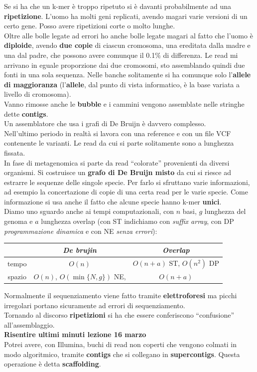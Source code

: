 \documentclass[a4paper,12pt, oneside]{book}
\begin{document}
Se si ha che un k-mer è troppo ripetuto si è davanti probabilmente ad una
\textbf{ripetizione}. L'uomo ha molti geni replicati, avendo magari varie
versioni di un certo gene. Posso avere ripetizioni corte o molto lunghe.\\
Oltre alle bolle legate ad errori ho anche bolle legate magari al fatto che
l'uomo è \textbf{diploide}, avendo \textbf{due copie} di ciascun cromosoma, una
ereditata dalla madre e una dal padre, che possono avere comunque il 0.1\% di
differenza. Le read mi arrivano in eguale proporzione dai due cromosomi, sto
assemblando quindi due fonti in una sola sequenza. Nelle banche solitamente si
ha comunque solo l'\textbf{allele di maggioranza} (l'\textbf{allele}, dal punto
di vista informatico, è la base variata a livello di cromosoma). \\
Vanno rimosse anche le \textbf{bubble} e i cammini vengono assemblate nelle
stringhe dette \textbf{contigs}.\\
Un assemblatore che usa i grafi di De Bruijn è davvero complesso.\\
Nell'ultimo periodo in realtà si lavora con una reference e con un file VCF
contenente le varianti. Le read da cui si parte solitamente sono a lunghezza
fissata. \\
In fase di metagenomica si parte da read ``colorate'' provenienti da diversi
organismi. Si costruisce un \textbf{grafo di De Bruijn misto} da cui si riesce
ad estrarre le sequenze delle singole specie. Per farlo si sfruttano varie
informazioni, ad esempio la concertazione di copie di una certa read per le
varie specie. Come informazione si usa anche il fatto che alcune specie hanno
k-mer \textbf{unici}. \\
Diamo uno sguardo anche ai tempi computazionali, con $n$ basi, $g$ lunghezza del
genoma e $a$ lunghezza overlap (con ST indichiamo con \textit{suffix array}, con
DP \textit{programmazione dinamica} e con NE \textit{senza errori}): 
\begin{table}[H]
  \centering
  \begin{tabular}{c|c|c}
    &\textbf{\textit{De brujin}} &\textbf{\textit{Overlap}}\\
    \hline
    tempo & $O(n)$ & $O(n+a)$ ST, $O(n^2)$ DP\\                 
    \hline
    spazio & $O(n)$, $O(\min\{N,g\})$ NE, & $O(n+a)$
  \end{tabular}
\end{table}
Normalmente il sequenziamento viene fatto tramite \textbf{elettroforesi} ma
picchi irregolari portano sicuramente ad errori di sequenziamento.\\
Tornando al discorso \textbf{ripetizioni} si ha che essere conferiscono
``confusione'' all'assemblaggio.\\
\textbf{Risentire ultimi minuti lezione 16 marzo}\\
Potrei avere, con Illumina, buchi di read non coperti che vengono colmati in
modo algoritmico, tramite \textbf{contigs} che si collegano in
\textbf{supercontigs}. Questa operazione è detta \textbf{scaffolding}.
\end{document}
